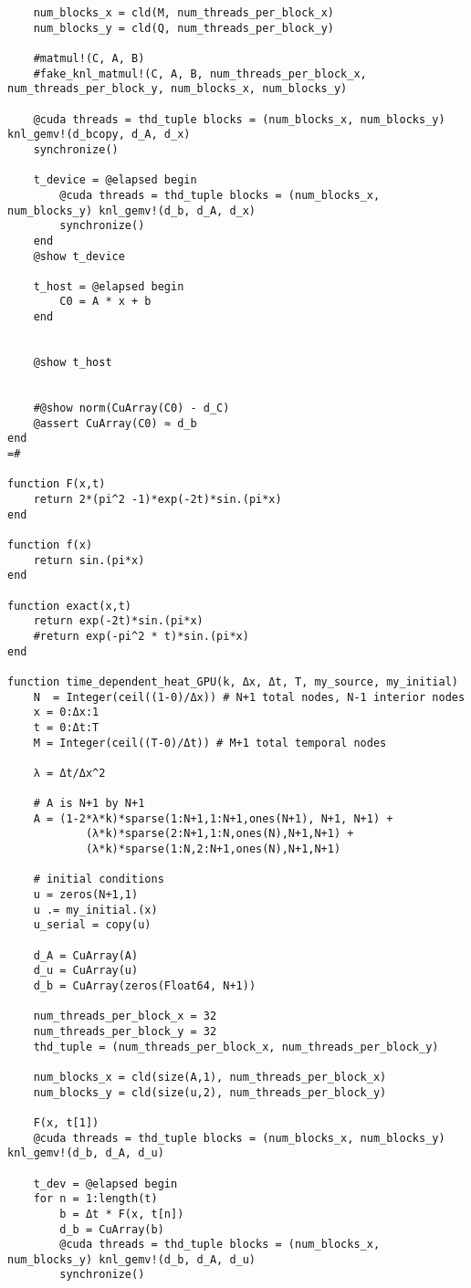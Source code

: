 \documentclass[12pt]{article}
\begin{document}
\begin{verbatim}
    num_blocks_x = cld(M, num_threads_per_block_x)
    num_blocks_y = cld(Q, num_threads_per_block_y)

    #matmul!(C, A, B)
    #fake_knl_matmul!(C, A, B, num_threads_per_block_x, num_threads_per_block_y, num_blocks_x, num_blocks_y)

    @cuda threads = thd_tuple blocks = (num_blocks_x, num_blocks_y) knl_gemv!(d_bcopy, d_A, d_x)
    synchronize()

    t_device = @elapsed begin
        @cuda threads = thd_tuple blocks = (num_blocks_x, num_blocks_y) knl_gemv!(d_b, d_A, d_x)
        synchronize()
    end
    @show t_device

    t_host = @elapsed begin
        C0 = A * x + b
    end


    @show t_host


    #@show norm(CuArray(C0) - d_C)
    @assert CuArray(C0) ≈ d_b
end
=#

function F(x,t)
    return 2*(pi^2 -1)*exp(-2t)*sin.(pi*x)
end

function f(x)
    return sin.(pi*x)
end

function exact(x,t)
    return exp(-2t)*sin.(pi*x)
    #return exp(-pi^2 * t)*sin.(pi*x)
end

function time_dependent_heat_GPU(k, Δx, Δt, T, my_source, my_initial)
    N  = Integer(ceil((1-0)/Δx)) # N+1 total nodes, N-1 interior nodes
    x = 0:Δx:1
    t = 0:Δt:T
    M = Integer(ceil((T-0)/Δt)) # M+1 total temporal nodes

    λ = Δt/Δx^2

    # A is N+1 by N+1
    A = (1-2*λ*k)*sparse(1:N+1,1:N+1,ones(N+1), N+1, N+1) +
            (λ*k)*sparse(2:N+1,1:N,ones(N),N+1,N+1) +
            (λ*k)*sparse(1:N,2:N+1,ones(N),N+1,N+1)

    # initial conditions
    u = zeros(N+1,1)
    u .= my_initial.(x)
    u_serial = copy(u)

    d_A = CuArray(A)
    d_u = CuArray(u)
    d_b = CuArray(zeros(Float64, N+1))

    num_threads_per_block_x = 32
    num_threads_per_block_y = 32
    thd_tuple = (num_threads_per_block_x, num_threads_per_block_y)

    num_blocks_x = cld(size(A,1), num_threads_per_block_x)
    num_blocks_y = cld(size(u,2), num_threads_per_block_y)

    F(x, t[1])
    @cuda threads = thd_tuple blocks = (num_blocks_x, num_blocks_y) knl_gemv!(d_b, d_A, d_u)

    t_dev = @elapsed begin
    for n = 1:length(t)
        b = Δt * F(x, t[n])
        d_b = CuArray(b)
        @cuda threads = thd_tuple blocks = (num_blocks_x, num_blocks_y) knl_gemv!(d_b, d_A, d_u)
        synchronize()


\end{verbatim}
\end{document}
